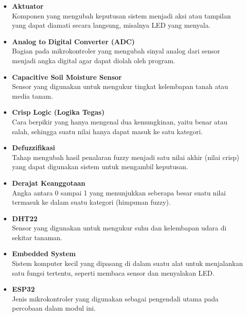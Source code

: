 \documentclass[12pt,a4paper]{article}
\begin{document}
\begin{itemize}[label={}, leftmargin=0pt, itemsep=0.35cm]
    \item \textbf{Aktuator}\\
    Komponen yang mengubah keputusan sistem menjadi aksi atau tampilan yang dapat diamati secara langsung, misalnya LED yang menyala.

    \item \textbf{Analog to Digital Converter (ADC)}\\
    Bagian pada mikrokontroler yang mengubah sinyal analog dari sensor menjadi angka digital agar dapat diolah oleh program.

    \item \textbf{Capacitive Soil Moisture Sensor}\\
    Sensor yang digunakan untuk mengukur tingkat kelembapan tanah atau media tanam.

    \item \textbf{Crisp Logic (Logika Tegas)}\\
    Cara berpikir yang hanya mengenal dua kemungkinan, yaitu benar atau salah, sehingga suatu nilai hanya dapat masuk ke satu kategori.

    \item \textbf{Defuzzifikasi}\\
    Tahap mengubah hasil penalaran fuzzy menjadi satu nilai akhir (nilai crisp) yang dapat digunakan sistem untuk mengambil keputusan.

    \item \textbf{Derajat Keanggotaan}\\
    Angka antara 0 sampai 1 yang menunjukkan seberapa besar suatu nilai termasuk ke dalam suatu kategori (himpunan fuzzy).

    \item \textbf{DHT22}\\
    Sensor yang digunakan untuk mengukur suhu dan kelembapan udara di sekitar tanaman.

    \item \textbf{Embedded System}\\
    Sistem komputer kecil yang dipasang di dalam suatu alat untuk menjalankan satu fungsi tertentu, seperti membaca sensor dan menyalakan LED.

    \item \textbf{ESP32}\\
    Jenis mikrokontroler yang digunakan sebagai pengendali utama pada percobaan dalam modul ini.


\end{itemize}
\end{document}
